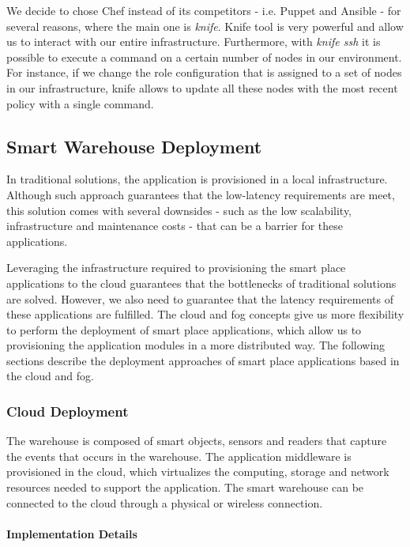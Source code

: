 We decide to chose Chef instead of its competitors - i.e. Puppet and Ansible - for several
reasons, where the main one is \textit{knife}. Knife tool is very powerful and allow us to
interact with our entire infrastructure. Furthermore, with \textit{knife ssh} it is possible
to execute a command on a certain number of nodes in our environment. For instance, if we change
the role configuration that is assigned to a set of nodes in our infrastructure, knife allows to
update all these nodes with the most recent policy with a single command.

\subsection{Smart Warehouse Deployment}
\label{sub:sol_smart_warehouse_deployment}
In traditional solutions, the application is provisioned in a local infrastructure. Although such
approach guarantees that the low-latency requirements are meet, this solution comes with several
downsides - such as the low scalability, infrastructure and maintenance costs - that can be a
barrier for these applications.

Leveraging the infrastructure required to provisioning the smart place applications to the cloud
guarantees that the bottlenecks of traditional solutions are solved. However, we also need to
guarantee that the latency requirements of these applications are fulfilled. The cloud and fog concepts
give us more flexibility to perform the deployment of smart place applications, which allow us to
provisioning the application modules in a more distributed way. The following sections describe
the deployment approaches of smart place applications based in the cloud and fog.

\subsubsection{Cloud Deployment}
\label{subs:sol_cloud}
The warehouse is composed of smart objects, sensors and readers that capture the events that occurs
in the warehouse. The application middleware is provisioned in the cloud, which virtualizes the computing,
storage and network resources needed to support the application. The smart warehouse can be connected
to the cloud through a physical or wireless connection.

\paragraph{Implementation Details}
\label{par:imp_smart_warehouse_cloud}

